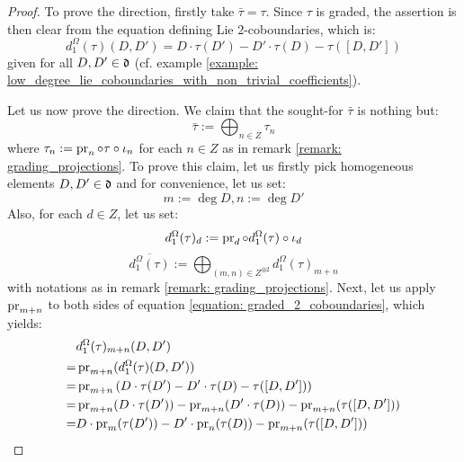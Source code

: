             \begin{proof}
                To prove the  direction, firstly take $\bar{\tau} = \tau$. Since $\tau$ is graded, the assertion is then clear from the equation defining Lie $2$-coboundaries, which is:
                    \begin{equation} \label{equation: graded_2_coboundaries}
                        d_1^{\Omega}(\tau)(D, D') = D \cdot \tau(D') - D' \cdot \tau(D) - \tau([D, D'])
                    \end{equation}
                given for all $D, D' \in \mathfrak{d}$ (cf. example \ref{example: low_degree_lie_coboundaries_with_non_trivial_coefficients}).
            
                Let us now prove the  direction. We claim that the sought-for $\bar{\tau}$ is nothing but:
                    $$\bar{\tau} := \bigoplus_{n \in Z} \tau_n$$
                where $\tau_n := \pr_n \circ \tau \circ \iota_n$ for each $n \in Z$ as in remark \ref{remark: grading_projections}. To prove this claim, let us firstly pick homogeneous elements $D, D' \in \d$ and for convenience, let us set:
                    $$m := \deg D, n := \deg D'$$
                Also, for each $d \in Z$, let us set:
                    $$d_1^{\Omega}(\tau)_d := \pr_d \circ d_1^{\Omega}(\tau) \circ \iota_d$$
                    $$\overline{d_1^{\Omega}(\tau)} := \bigoplus_{(m, n) \in Z^{\oplus 2} } d_1^{\Omega}(\tau)_{m + n}$$
                with notations as in remark \ref{remark: grading_projections}. Next, let us apply $\pr_{m + n}$ to both sides of equation \eqref{equation: graded_2_coboundaries}, which yields:
                    $$
                        \begin{aligned}
                            & d_1^{\Omega}(\tau)_{m + n}(D, D')
                            \\
                            = & \pr_{m + n}( d_1^{\Omega}(\tau)(D, D') )
                            \\
                            = & \pr_{m + n}\left( D \cdot \tau(D') - D' \cdot \tau(D) - \tau([D, D']) \right)
                            \\
                            = & \pr_{m + n}(D \cdot \tau(D')) - \pr_{m + n}(D' \cdot \tau(D)) - \pr_{m + n}(\tau([D, D']))
                            \\
                            = & D \cdot \pr_m( \tau(D') ) - D' \cdot \pr_n( \tau(D) ) - \pr_{m + n}(\tau([D, D']))
                            \\

\end{aligned}$$
\end{proof}
